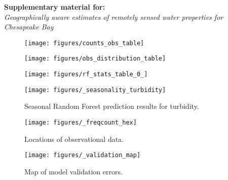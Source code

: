 \documentclass[12pt]{article}
\begin{document}
\begin{center}
\textbf{Supplementary material for:}\\
\emph{Geographically aware estimates of remotely sensed water properties for Chesapeake Bay}
\end{center}

\begin{figure}[h!]
    \begin{center}
          \texttt{[image: figures/counts\_obs\_table]}
    \end{center}    
\end{figure}

\begin{figure}[h!]
    \begin{center}
          \texttt{[image: figures/obs\_distribution\_table]}
    \end{center}    
\end{figure}

\begin{figure}[h!]
    \begin{center}
          \texttt{[image: figures/rf\_stats\_table\_0\_]}
    \end{center}    
\end{figure}

\begin{figure}[h!]
    \begin{center}
          \texttt{[image: figures/\_seasonality\_turbidity]}
          \caption{Seasonal Random Forest prediction results for turbidity.}
    \end{center}    
\end{figure}

\begin{figure}[h!]
    \begin{center}
          \texttt{[image: figures/\_freqcount\_hex]}
          \caption{Locations of observational data.}
    \end{center}    
\end{figure}

\begin{figure}[h!]
    \begin{center}
          \texttt{[image: figures/\_validation\_map]}
          \caption{Map of model validation errors.}
    \end{center}    
\end{figure}

\clearpage
\end{document}
